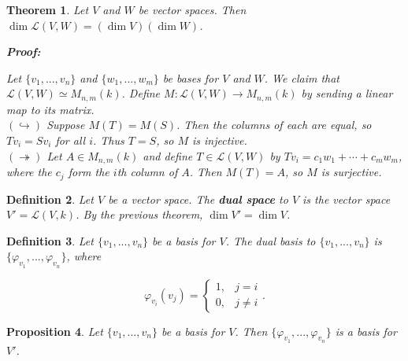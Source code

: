 \documentclass{article}
\theoremstyle{colontheorem}
\newtheorem{theorem}{Theorem}[section]
\newtheorem{proposition}[theorem]{Proposition}
\newtheorem{definition}[theorem]{Definition}
\newenvironment{Theorem}
{
	\begin{mdframed}[backgroundcolor=TheoremOrange!10]
	\begin{theorem}
}
{
	\end{theorem}
	\end{mdframed}
	
	\vspace{.15in}
}
\newenvironment{Proposition}
{
	\begin{mdframed}[backgroundcolor=TheoremOrange!10]
	\begin{proposition}
}
{
	\end{proposition}
	\end{mdframed}
	
	\vspace{.15in}
}
\newenvironment{Def}
{
	\begin{mdframed}[backgroundcolor=DefGreen!10]
	\begin{definition}
}
{
	\end{definition}
	\end{mdframed}
	
	\vspace{.15in}
}
\newenvironment{Proof}
{
	\begin{mdframed}[backgroundcolor=ProofPurple!10]
	\textbf{Proof:}%
}
{
	\end{mdframed}
	
	\vspace{.085in}
}
\begin{document}
\begin{Theorem}
	
	Let $V$ and $W$ be vector spaces. Then $\dim \mathcal{L}(V,W) = (\dim V)(\dim W)$.
	
	\begin{Proof}
		Let $\{v_1, ..., v_n\}$ and $\{w_1, ..., w_m\}$ be bases for $V$ and $W$. We claim that $\mathcal{L}(V,W) \simeq M_{n, m}(k)$. Define $M : \mathcal{L}(V,W) \longrightarrow M_{n, m}(k)$ by sending a linear map to its matrix.\\
		
		$(\hookrightarrow)$ Suppose $M(T) = M(S)$. Then the columns of each are equal, so $Tv_i = Sv_i$ for all $i$. Thus $T = S$, so $M$ is injective.\\
		
		$(\twoheadrightarrow)$ Let $A \in M_{n, m}(k)$ and define $T \in \mathcal{L}(V,W)$ by $Tv_i = c_1 w_1 + \cdots + c_m w_m$, where the $c_j$ form the $i$th column of $A$. Then $M(T) = A$, so $M$ is surjective.
		
	\end{Proof}
	
\end{Theorem}



\begin{Def}
	
	Let $V$ be a vector space. The \textbf{dual space} to $V$ is the vector space $V' = \mathcal{L}(V, k)$. By the previous theorem, $\dim V' = \dim V$.
	
\end{Def}



\begin{Def}
	
	Let $\{v_1, ..., v_n\}$ be a basis for $V$. The dual basis to $\{v_1, ..., v_n\}$ is $\{\varphi_{v_1}, ..., \varphi_{v_n}\}$, where
	
	$$
		\varphi_{v_i}(v_j) = \begin{cases} 
		1, & j = i \\
		0, & j \neq i
		\end{cases}.
	$$
	
\end{Def}



\begin{Proposition}
	
	Let $\{v_1, ..., v_n\}$ be a basis for $V$. Then $\{\varphi_{v_1}, ..., \varphi_{v_n}\}$ is a basis for $V'$.
	
\end{Proposition}
\end{document}

